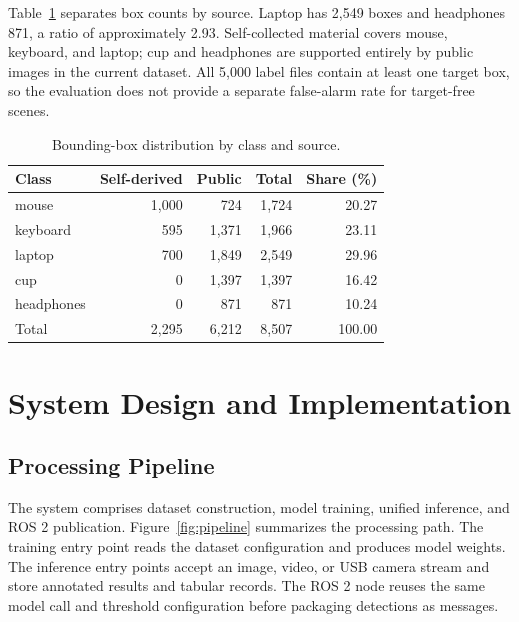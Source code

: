 \documentclass[12pt,a4paper]{article}
\begin{document}
Table~\ref{tab:classdist} separates box counts by source. Laptop has 2,549 boxes and headphones 871, a ratio of approximately 2.93. Self-collected material covers mouse, keyboard, and laptop; cup and headphones are supported entirely by public images in the current dataset. All 5,000 label files contain at least one target box, so the evaluation does not provide a separate false-alarm rate for target-free scenes.

\begin{table}[htbp]
\caption{Bounding-box distribution by class and source.}
\label{tab:classdist}
\centering
\small
\begin{tabular}{lrrrr}
\toprule
Class & Self-derived & Public & Total & Share (\%) \\
\midrule
mouse & 1,000 & 724 & 1,724 & 20.27 \\
keyboard & 595 & 1,371 & 1,966 & 23.11 \\
laptop & 700 & 1,849 & 2,549 & 29.96 \\
cup & 0 & 1,397 & 1,397 & 16.42 \\
headphones & 0 & 871 & 871 & 10.24 \\
\midrule
Total & 2,295 & 6,212 & 8,507 & 100.00 \\
\bottomrule
\end{tabular}
\end{table}

\FloatBarrier

\section{System Design and Implementation}

\subsection{Processing Pipeline}

The system comprises dataset construction, model training, unified inference, and ROS 2 publication. Figure~\ref{fig:pipeline} summarizes the processing path. The training entry point reads the dataset configuration and produces model weights. The inference entry points accept an image, video, or USB camera stream and store annotated results and tabular records. The ROS 2 node reuses the same model call and threshold configuration before packaging detections as messages.
\end{document}

